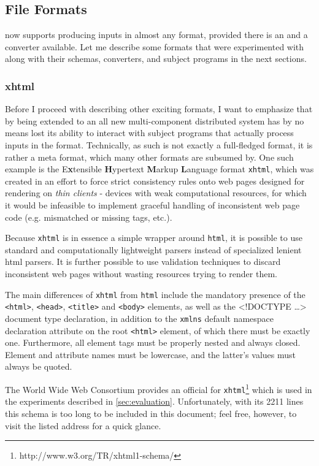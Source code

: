 \subsection{File Formats}
\label{sec:formats}
\xmlmate now supports producing inputs in almost any format, provided there is an \xsd and a converter
available. Let me describe some formats that were experimented with along with their schemas, converters, and
subject programs in the next sections.
\tocless\subsubsection{xhtml}
Before I proceed with describing other exciting formats, I want to emphasize that by being extended to an all
new multi-component distributed system \xmlmate has by no means lost its ability to interact with subject
programs that actually process inputs in the \xml format. Technically, \xml as such is not exactly a
full-fledged format, it is rather a meta format, which many other formats are subsumed by. One
such example is the E\textbf{x}tensible \textbf{H}ypertext \textbf{M}arkup \textbf{L}anguage format
\texttt{xhtml}, which was created in an effort to force strict consistency rules onto web pages designed for
rendering on \emph{thin clients} - devices with weak computational resources, for which it would be infeasible
to implement graceful handling of inconsistent web page code (e.g. mismatched or missing tags, etc.). 
 
Because \texttt{xhtml} is in essence a simple \xml wrapper around \texttt{html}, it is possible to use standard
and computationally lightweight \xml parsers instead of specialized lenient html parsers. It is further
possible to use \xml validation techniques to discard inconsistent web pages without wasting resources trying
to render them.

The main differences of \texttt{xhtml} from \texttt{html} include the mandatory presence of the
\texttt{<html>}, \texttt{<head>}, \texttt{<title>} and \texttt{<body>} elements, as well as the {\small
<!DOCTYPE \ldots>} document type declaration, in addition to the \texttt{xmlns} default namespace declaration
attribute on the root \texttt{<html>} element, of which there must be exactly one. Furthermore, all element
tags must be properly nested and always closed. Element and attribute names must be lowercase, and the
latter's values must always be quoted.

The World Wide Web Consortium provides an official \xsd for
\texttt{xhtml}\footnote{http://www.w3.org/TR/xhtml1-schema/} which is used in the \xmlmate experiments
described in \cref{sec:evaluation}. Unfortunately, with its 2211 lines this schema is too long to be included
in this document; feel free, however, to visit the listed address for a quick glance.

